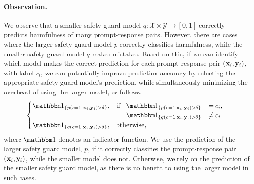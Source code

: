\paragraph{Observation.}  We observe that a smaller safety guard model $q: \mathcal{X} \times\mathcal{Y}\to[0,1]$ correctly predicts harmfulness of many prompt-response pairs. 
However, there are cases where the larger safety guard model $p$ correctly classifies harmfulness, while the smaller safety guard model $q$ makes mistakes. 
Based on this, if we can identify which model makes the correct prediction for each prompt-response pair $({\mathbf{x}}_i, {\mathbf{y}}_i)$, with label $c_i$, we can potentially improve prediction accuracy by selecting the appropriate safety guard model's prediction, while simultaneously minimizing the overhead of using the larger model, as follows: 
\begin{align*}
    \begin{cases}
        \one_{\{p(c=1 \mid \rvx_i, \rvy_i) > \delta \}}\text{,} 
        & \text{if } 
        \begin{array}[t]{rl}
            \one_{\{p(c=1 \mid \rvx_i, \rvy_i) > \delta\}} & = c_i, \\
            \one_{\{q(c=1 \mid \rvx_i, \rvy_i) > \delta\}} & \neq c_i
        \end{array} \\
        \one_{\{q(c=1 \mid \rvx_i, \rvy_i) > \delta \}}\text{,} 
        & \text{otherwise},
    \end{cases}
\end{align*}
where $\one$ denotes an indicator function. We use the prediction of the larger safety guard model, $p$, if it correctly classifies the prompt-response pair $({\mathbf{x}}_i, {\mathbf{y}}_i)$, while the smaller model does not. Otherwise, we rely on the prediction of the smaller safety guard model, as there is no benefit to using the larger model in such cases.  

